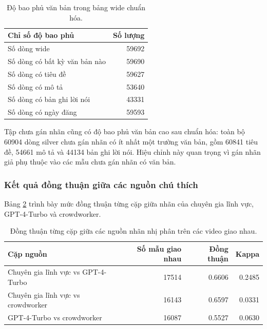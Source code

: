 \begin{table}[H]
\centering
\small
\renewcommand{\arraystretch}{1.25}
\begin{tabular}{|l|r|}
\hline
\textbf{Chỉ số độ bao phủ} & \textbf{Số lượng} \\
\hline
Số dòng wide & 59692 \\
\hline
Số dòng có bất kỳ văn bản nào & 59690 \\
\hline
Số dòng có tiêu đề & 59627 \\
\hline
Số dòng có mô tả & 53640 \\
\hline
Số dòng có bản ghi lời nói & 43331 \\
\hline
Số dòng có ngày đăng & 59593 \\
\hline
\end{tabular}
\caption{Độ bao phủ văn bản trong bảng wide chuẩn hóa.}
\label{tab:implementation-text-coverage}
\end{table}

Tập chưa gán nhãn cũng có độ bao phủ văn bản cao sau chuẩn hóa: toàn bộ 60904 dòng silver chưa gán nhãn có ít nhất một trường văn bản, gồm 60841 tiêu đề, 54661 mô tả và 44134 bản ghi lời nói. Hiệu chỉnh này quan trọng vì gán nhãn giả phụ thuộc vào các mẫu chưa gán nhãn có văn bản.

\subsubsection{Kết quả đồng thuận giữa các nguồn chú thích}

Bảng \ref{tab:implementation-agreement} trình bày mức đồng thuận từng cặp giữa nhãn của chuyên gia lĩnh vực, GPT-4-Turbo và crowdworker.

\begin{table}[H]
\centering
\small
\renewcommand{\arraystretch}{1.25}
\begin{tabular}{|l|r|r|r|}
\hline
\textbf{Cặp nguồn} & \textbf{Số mẫu giao nhau} & \textbf{Đồng thuận} & \textbf{Kappa} \\
\hline
Chuyên gia lĩnh vực vs GPT-4-Turbo & 17514 & 0.6606 & 0.2485 \\
\hline
Chuyên gia lĩnh vực vs crowdworker & 16143 & 0.6597 & 0.0331 \\
\hline
GPT-4-Turbo vs crowdworker & 16087 & 0.5527 & 0.0630 \\
\hline
\end{tabular}
\caption{Đồng thuận từng cặp giữa các nguồn nhãn nhị phân trên các video giao nhau.}
\label{tab:implementation-agreement}
\end{table}

